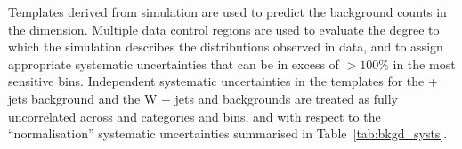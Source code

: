 Templates derived from simulation are used to predict the background
counts in the \mht dimension. Multiple data control regions are used
to evaluate the degree to which the simulation describes the \mht
distributions observed in data, and to assign appropriate systematic
uncertainties that can be in excess of $>100\%$ in the most sensitive
\mht bins. Independent systematic uncertainties in the templates for
the \znunu + jets background and the W + jets and \ttbar backgrounds
are treated as fully uncorrelated across \njet and \nb categories and
\scalht bins, and with respect to the ``normalisation'' systematic
uncertainties summarised in Table~\ref{tab:bkgd_systs}.

